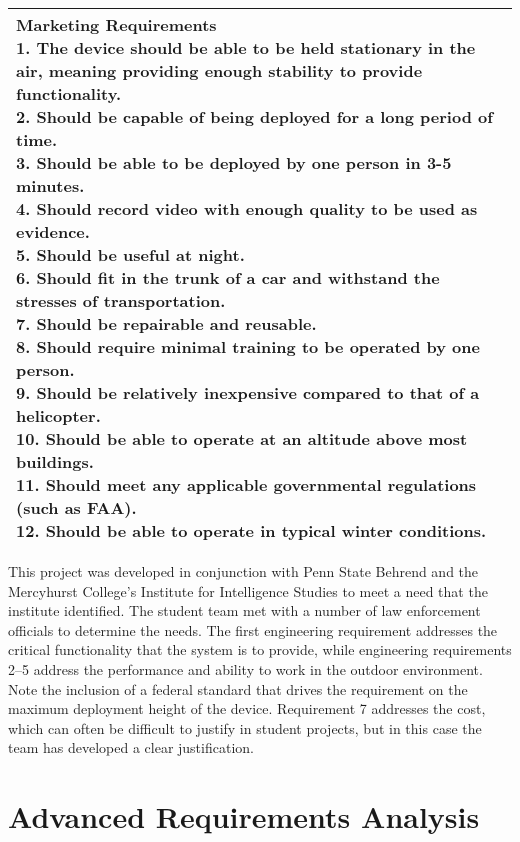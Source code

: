 \begin{table}
\begin{tabular}{ |p{2cm}|p{5cm}|p{5cm}|}
\multicolumn{3}{|p{12cm}|}{
\textbf{Marketing Requirements}\newline
1.  The device should be able to be held stationary in the air, meaning
  providing enough stability to provide functionality.\newline
2.  Should be capable of being deployed for a long period of time.\newline
3.   Should be able to be deployed by one person in 3-5 minutes.\newline
4.  Should record video with enough quality to be used as evidence.\newline
5.  Should be useful at night.\newline
6.  Should fit in the trunk of a car and withstand the stresses of
  transportation.\newline
7.  Should be repairable and reusable.\newline
8.  Should require minimal training to be operated by one person.\newline
9.  Should be relatively inexpensive compared to that of a helicopter.\newline
10.  Should be able to operate at an altitude above most buildings.\newline
11.  Should meet any applicable governmental regulations (such as FAA).\newline
12.  Should be able to operate in typical winter conditions.}  \\ \hline
\end{tabular}
\end{table}

This project was developed in conjunction with Penn State Behrend and
the Mercyhurst College's Institute for Intelligence Studies to meet a
need that the institute identified. The student team met with a number
of law enforcement officials to determine the needs. The first
engineering requirement addresses the critical functionality that the
system is to provide, while engineering requirements 2--5 address the
performance and ability to work in the outdoor environment. Note the
inclusion of a federal standard that drives the requirement on the
maximum deployment height of the device. Requirement 7 addresses the
cost, which can often be difficult to justify in student projects, but
in this case the team has developed a clear justification.

\section{Advanced Requirements Analysis}
\label{section:advanced-requirements-analysis}

